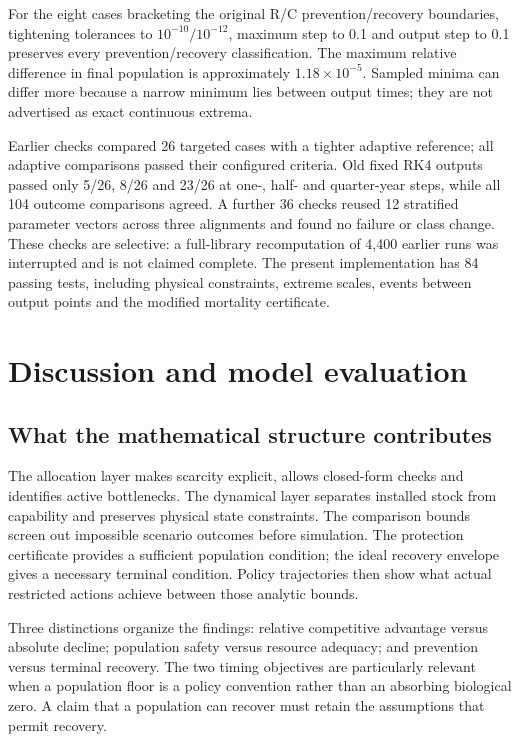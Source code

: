 \documentclass[12pt,a4paper]{article}
\theoremstyle{remark}
\begin{document}
For the eight cases bracketing the original R/C prevention/recovery boundaries, tightening tolerances to $10^{-10}/10^{-12}$, maximum step to 0.1 and output step to 0.1 preserves every prevention/recovery classification. The maximum relative difference in final population is approximately $1.18\times10^{-5}$. Sampled minima can differ more because a narrow minimum lies between output times; they are not advertised as exact continuous extrema.

Earlier checks compared 26 targeted cases with a tighter adaptive reference; all adaptive comparisons passed their configured criteria. Old fixed RK4 outputs passed only 5/26, 8/26 and 23/26 at one-, half- and quarter-year steps, while all 104 outcome comparisons agreed. A further 36 checks reused 12 stratified parameter vectors across three alignments and found no failure or class change. These checks are selective: a full-library recomputation of 4,400 earlier runs was interrupted and is not claimed complete. The present implementation has 84 passing tests, including physical constraints, extreme scales, events between output points and the modified mortality certificate.

\section{Discussion and model evaluation}\label{sec:discussion}
\subsection{What the mathematical structure contributes}
The allocation layer makes scarcity explicit, allows closed-form checks and identifies active bottlenecks. The dynamical layer separates installed stock from capability and preserves physical state constraints. The comparison bounds screen out impossible scenario outcomes before simulation. The protection certificate provides a sufficient population condition; the ideal recovery envelope gives a necessary terminal condition. Policy trajectories then show what actual restricted actions achieve between those analytic bounds.

Three distinctions organize the findings: relative competitive advantage versus absolute decline; population safety versus resource adequacy; and prevention versus terminal recovery. The two timing objectives are particularly relevant when a population floor is a policy convention rather than an absorbing biological zero. A claim that a population can recover must retain the assumptions that permit recovery.
\end{document}
